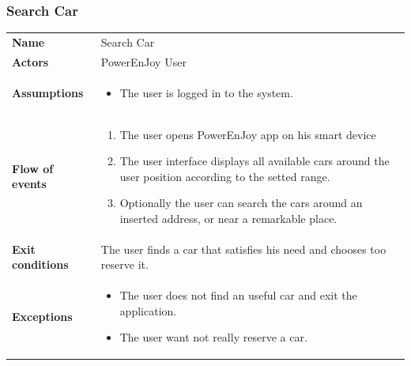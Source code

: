 \documentclass[english]{article}
\begin{document}
	\subsubsection{Search Car}
	\begin{center}
	\begin{tabular}{l||p{10cm}}
	\textbf{Name} 
		& Search Car\\ [8px]
	\textbf{Actors} 
		& PowerEnJoy User\\ [8px]
	\textbf{Assumptions} 
		& \begin{itemize}
			\item The user is logged in to the system.
		\end{itemize}\\
	\textbf{Flow of events}
		& \begin{enumerate}
	 		\item The user opens PowerEnJoy app on his smart device
	 		\item The user interface displays all available cars around the user position according to the setted range. 
			\item Optionally the user can search the cars around an inserted address, or near a remarkable place. 
		\end{enumerate}\\ 
	\textbf{Exit conditions}
		&The user finds a car that satisfies his need and chooses too reserve it.\\ [8px]
	\textbf{Exceptions}
		& \begin{itemize}
			\item The user does not find an useful car and exit the application.
			\item The user want not really reserve a car. 
		\end{itemize}
	\end{tabular}
	\end{center}
\end{document}
